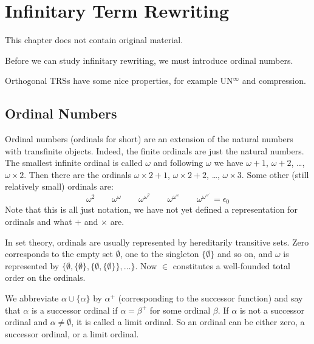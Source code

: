 \chapter{Infinitary Term Rewriting}\label{chap:rewriting}

This chapter does not contain original material.

Before we can study infinitary rewriting, we must introduce ordinal numbers.

Orthogonal TRSs have some nice properties, for example UN$^{\infty}$ and
compression.



\section{Ordinal Numbers}


Ordinal numbers (ordinals for short) are an extension of the natural numbers
with transfinite objects. Indeed, the finite ordinals are just the natural
numbers. The smallest infinite ordinal is called $\omega$ and following
$\omega$ we have $\omega + 1$, $\omega + 2$, \ldots, $\omega \times 2$. Then
there are the ordinals $\omega \times 2 + 1$, $\omega \times 2 + 2$, \ldots,
$\omega \times 3$. Some other (still relatively small) ordinals are:
\begin{displaymath}
  \omega^2 \qquad
  \omega^\omega \qquad
  \omega^{\omega^2} \qquad
  \omega^{\omega^\omega} \qquad
  \omega^{\omega^{\omega^{\iddots}}} = \epsilon_0
\end{displaymath}
Note that this is all just notation, we have not yet defined a representation
for ordinals and what $+$ and $\times$ are.

In set theory, ordinals are usually represented by hereditarily transitive
sets. Zero corresponds to the empty set $\emptyset$, one to the singleton $\{
\emptyset \}$ and so on, and $\omega$ is represented by $\{ \emptyset, \{
\emptyset \}, \{ \emptyset, \{ \emptyset \} \} , \ldots \}$. Now $\in$
constitutes a well-founded total order on the ordinals.

We abbreviate $\alpha \cup \{ \alpha \}$ by $\alpha^+$ (corresponding to the
successor function) and say that $\alpha$ is a successor ordinal if $\alpha =
\beta^+$ for some ordinal $\beta$. If $\alpha$ is not a successor ordinal and
$\alpha \neq \emptyset$, it is called a limit ordinal. So an ordinal can
be either zero, a successor ordinal, or a limit ordinal.

